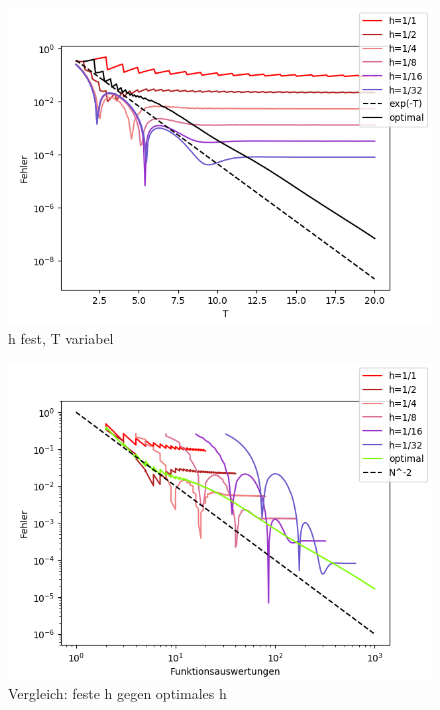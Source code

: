 \begin{figure}[hbt!]
    \centering
    \includegraphics[width=\linewidth]{Aufgabe_1/fehler_T.png}
    \caption{h fest, T variabel}
    \label{fig:my_label}
\end{figure}



\begin{figure}
    \centering
    \includegraphics[width=\linewidth]{Aufgabe_1/optimal.png}
    \caption{Vergleich: feste h gegen optimales h }
    \label{fig:my_label}
\end{figure}
\pagebreak
\FloatBarrier
